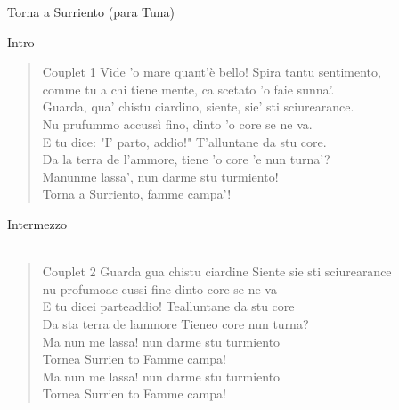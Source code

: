 \begin{song}[vals]{Torna a Surriento (para Tuna)}

\begin{instrumental}{Intro}
   \\
  
\end{instrumental}


\begin{verse}{Couplet 1}
Vide 'o mare quant'è bello! Spira tantu sentimento, \\
comme tu a chi tiene mente, ca scetato 'o faie sunna'. \\
Guarda, qua' chistu ciardino, siente, sie' sti sciurearance.\\
Nu prufummo accussì fino, dinto 'o core se ne va.\\
E tu dice: "I' parto, addio!" T'alluntane da stu core.\\
Da la terra de l'ammore, tiene 'o core 'e nun turna'? \\
Manunme lassa',     nun darme stu turmiento!\\
Torna a Surriento,       famme campa'! 
\end{verse}

\begin{instrumental}{Intermezzo}
 \measure{} \measure{} \measure*{}\\
  \\
 
\end{instrumental}

\begin{verse}{Couplet 2}
Guarda gua chistu ciardine Siente sie sti sciurearance\\
nu profumoac cussi fine dinto core se ne va\\
E tu dicei parteaddio! Tealluntane da stu core\\
Da sta terra de lammore Tieneo core nun turna?\\
Ma nun me lassa! nun darme stu turmiento\\
Tornea Surrien to Famme campa!\\
Ma nun me lassa! nun darme stu turmiento\\
Tornea Surrien to Famme campa!
\end{verse}
\end{song}